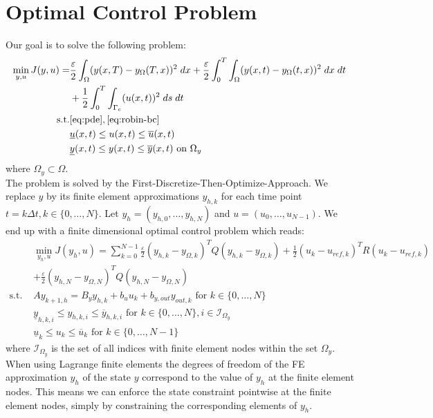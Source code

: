 \documentclass[
12pt, %
a4paper, %
onecolumn, %
portrait %
]{article}
\begin{document}
\section{Optimal Control Problem}
Our goal is to solve the following problem:
\begin{align*}
\min_{y,u} J(y, u) = & \frac{\varepsilon}{2}\int_{\Omega} (y(x, T) - y_{\Omega}(T,x))^2 \; dx + \frac{\varepsilon}{2} \int_{0}^{T} \int_{\Omega} (y(x,t) - y_{\Omega}(t,x))^2 \; dx \; dt \\
& + \frac{1}{2} \int_{0}^{T} \int_{\Gamma_c} (u(x,t))^2 \; ds \; dt \\
\text{s.t.} & \eqref{eq:pde}, \eqref{eq:robin-bc} \\
& \underline{u}(x,t) \leq u(x,t) \leq \overline{u}(x,t) \\
& \underline{y}(x,t) \leq y(x,t) \leq \overline{y}(x,t) \text{ on } \Omega_y
\end{align*}
where $\Omega_y \subset \Omega$.
\\
The problem is solved by the First-Discretize-Then-Optimize-Approach.
We replace $y$ by its finite element approximations $y_{h,k}$ for each time point $t = k \Delta t, k \in \{0, \hdots, N\}$. Let $y_h = (y_{h,0}, \hdots, y_{h,N})$ and $u = (u_0, \hdots, u_{N-1})$.
We end up with a finite dimensional optimal control problem which reads:
\begin{align*}
& \min_{y_h,u} J(y_h, u) = \sum_{k=0}^{N-1} \frac{\varepsilon}{2} (y_{h,k} - y_{\Omega,k})^T Q (y_{h,k} - y_{\Omega,k}) + \frac{1}{2} (u_k - u_{ref,k})^T R (u_k - u_{ref,k}) \\ 
& + \frac{\varepsilon}{2} (y_{h,N} - y_{\Omega,N})^T Q (y_{h,N} - y_{\Omega,N}) \\
\text{s.t. }  & A y_{k+1,h} = B_y y_{h,k} + b_u u_k + b_{y,out} y_{out,k} \text{ for } k \in \{0, \hdots, N\} \\
&\underline{y}_{h,k,i} \leq y_{h,k,i} \leq \overline{y}_{h,k,i} \text{ for } k \in \{0, \hdots, N\}, i \in \mathcal{I}_{\Omega_y} \\
&\underline{u}_{k} \leq u_{k} \leq \overline{u}_{k} \text{ for } k \in \{0, \hdots, N-1\}
\end{align*}
where $\mathcal{I}_{\Omega_y}$ is the set of all indices with finite element nodes within the set $\Omega_y$. When using Lagrange finite elements the degrees of freedom of the FE approximation $y_h$ of the state $y$ correspond to the value of $y_h$ at the finite element nodes. This means we can enforce the state constraint pointwise at the finite element nodes, simply by constraining the corresponding elements of $y_h$. \\
\end{document}
